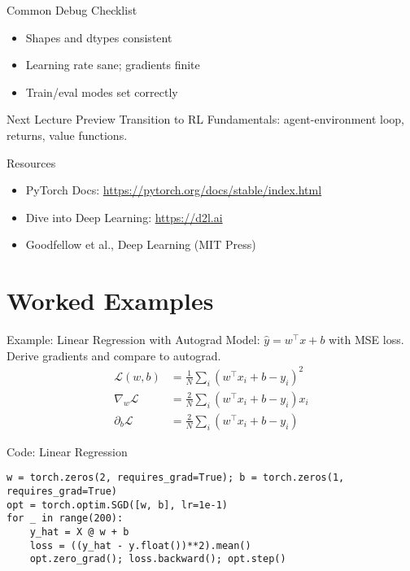 \documentclass[aspectratio=169,10pt]{beamer}
\begin{document}
\begin{frame}{Common Debug Checklist}
\begin{itemize}
    \item Shapes and dtypes consistent
    \item Learning rate sane; gradients finite
    \item Train/eval modes set correctly
\end{itemize}
\end{frame}

\begin{frame}{Next Lecture Preview}
Transition to RL Fundamentals: agent-environment loop, returns, value functions.
\end{frame}

\begin{frame}{Resources}
\begin{itemize}
    \item PyTorch Docs: \url{https://pytorch.org/docs/stable/index.html}
    \item Dive into Deep Learning: \url{https://d2l.ai}
    \item Goodfellow et al., Deep Learning (MIT Press)
\end{itemize}
\end{frame}

\section{Worked Examples}

\begin{frame}{Example: Linear Regression with Autograd}
Model: $\hat{y}=w^\top x + b$ with MSE loss. Derive gradients and compare to autograd.
\begin{align*}
\mathcal{L}(w,b) &= \frac{1}{N}\sum_i (w^\top x_i + b - y_i)^2 \\
\nabla_w \mathcal{L} &= \frac{2}{N} \sum_i (w^\top x_i + b - y_i) x_i \\
\partial_b \mathcal{L} &= \frac{2}{N} \sum_i (w^\top x_i + b - y_i)
\end{align*}
\end{frame}

\begin{frame}[fragile]{Code: Linear Regression}
\begin{lstlisting}
w = torch.zeros(2, requires_grad=True); b = torch.zeros(1, requires_grad=True)
opt = torch.optim.SGD([w, b], lr=1e-1)
for _ in range(200):
    y_hat = X @ w + b
    loss = ((y_hat - y.float())**2).mean()
    opt.zero_grad(); loss.backward(); opt.step()
\end{lstlisting}
\end{frame}
\end{document}
